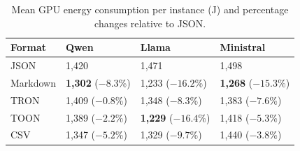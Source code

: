 \begin{table}[t]
\centering
\caption{Mean GPU energy consumption per instance (J) and percentage changes relative to JSON.}
\label{tab:rq2_energy}
\begin{tabularx}{\columnwidth}{lXXX}
\toprule
Format & Qwen & Llama & Ministral \\
\midrule
JSON & 1,420 & 1,471 & 1,498 \\
Markdown & \textbf{1,302} ($-8.3$\%) & 1,233 ($-16.2$\%) & \textbf{1,268} ($-15.3$\%) \\
TRON & 1,409 ($-0.8$\%) & 1,348 ($-8.3$\%) & 1,383 ($-7.6$\%) \\
TOON & 1,389 ($-2.2$\%) & \textbf{1,229} ($-16.4$\%) & 1,418 ($-5.3$\%) \\
CSV & 1,347 ($-5.2$\%) & 1,329 ($-9.7$\%) & 1,440 ($-3.8$\%) \\
\bottomrule
\end{tabularx}
\end{table}
